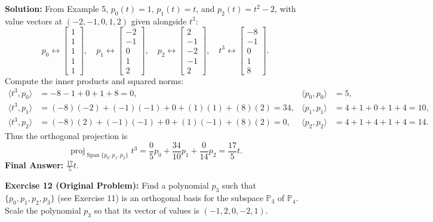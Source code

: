 \documentclass[11pt, letterpaper]{article}
\theoremstyle{definition}
\theoremstyle{remark}
\begin{document}
\textbf{Solution:}
From Example 5, $p_0(t) = 1$, $p_1(t) = t$, and $p_2(t) = t^2 - 2$, with value vectors at $(-2, -1, 0, 1, 2)$ given alongside $t^3$:
\[
    p_0 \leftrightarrow \begin{bmatrix} 1 \\ 1 \\ 1 \\ 1 \\ 1 \end{bmatrix}, \quad
    p_1 \leftrightarrow \begin{bmatrix} -2 \\ -1 \\ 0 \\ 1 \\ 2 \end{bmatrix}, \quad
    p_2 \leftrightarrow \begin{bmatrix} 2 \\ -1 \\ -2 \\ -1 \\ 2 \end{bmatrix}, \quad
    t^3 \leftrightarrow \begin{bmatrix} -8 \\ -1 \\ 0 \\ 1 \\ 8 \end{bmatrix}.
\]
Compute the inner products and squared norms:
\begin{align*}
    \langle t^3, p_0 \rangle &= -8 - 1 + 0 + 1 + 8 = 0, & \langle p_0, p_0 \rangle &= 5, \\
    \langle t^3, p_1 \rangle &= (-8)(-2) + (-1)(-1) + 0 + (1)(1) + (8)(2) = 34, & \langle p_1, p_1 \rangle &= 4 + 1 + 0 + 1 + 4 = 10, \\
    \langle t^3, p_2 \rangle &= (-8)(2) + (-1)(-1) + 0 + (1)(-1) + (8)(2) = 0, & \langle p_2, p_2 \rangle &= 4 + 1 + 4 + 1 + 4 = 14.
\end{align*}
Thus the orthogonal projection is
\[
    \operatorname{proj}_{\operatorname{Span}\{p_0, p_1, p_2\}} t^3 = \frac{0}{5}p_0 + \frac{34}{10}p_1 + \frac{0}{14}p_2 = \frac{17}{5}t.
\]
\textbf{Final Answer:} $\displaystyle \frac{17}{5}t$.

\textbf{Exercise 12 (Original Problem):} Find a polynomial $p_3$ such that $\{p_0, p_1, p_2, p_3\}$ (see Exercise 11) is an orthogonal basis for the subspace $\mathbb{P}_3$ of $\mathbb{P}_4$. Scale the polynomial $p_3$ so that its vector of values is $(-1, 2, 0, -2, 1)$.
\end{document}
